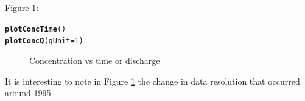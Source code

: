 \documentclass[a4paper,11pt]{article}\usepackage[]{graphicx}\usepackage[]{color}
\makeatletter
\newcommand{\hlnum}[1]{\textcolor[rgb]{0.686,0.059,0.569}{#1}}%
\newcommand{\hlstd}[1]{\textcolor[rgb]{0.345,0.345,0.345}{#1}}%
\newcommand{\hlkwc}[1]{\textcolor[rgb]{0.333,0.667,0.333}{#1}}%
\newcommand{\hlkwd}[1]{\textcolor[rgb]{0.737,0.353,0.396}{\textbf{#1}}}%
\newenvironment{kframe}{%
 \def\at@end@of@kframe{}%
 \ifinner\ifhmode%
  \def\at@end@of@kframe{\end{minipage}}%
  \begin{minipage}{\columnwidth}%
 \fi\fi%
 \def\FrameCommand##1{\hskip\@totalleftmargin \hskip-\fboxsep
 \colorbox{shadecolor}{##1}\hskip-\fboxsep
     \hskip-\linewidth \hskip-\@totalleftmargin \hskip\columnwidth}%
 \MakeFramed {\advance\hsize-\width
   \@totalleftmargin\z@ \linewidth\hsize
   \@setminipage}}%
 {\par\unskip\endMakeFramed%
 \at@end@of@kframe}
\newenvironment{knitrout}{}{} %
\makeatother
\begin{document}
Figure \ref{fig:plotConcTime}:
\begin{knitrout}
\color{fgcolor}\begin{kframe}
\begin{alltt}
\hlkwd{plotConcTime}\hlstd{()}
\hlkwd{plotConcQ}\hlstd{(}\hlkwc{qUnit}\hlstd{=}\hlnum{1}\hlstd{)}
\end{alltt}
\end{kframe}\begin{figure}[]
\caption[Concentration vs time or discharge]{Concentration vs time or discharge\label{fig:plotConcTime}}
\end{figure}


\end{knitrout}


It is interesting to note in Figure \ref{fig:plotConcTime} the change in data resolution that occurred around  1995.
\end{document}
